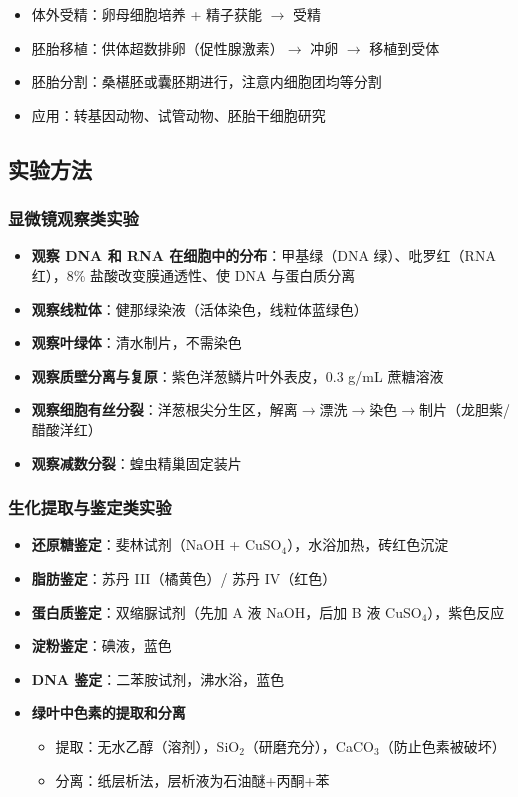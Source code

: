 \begin{itemize}
  \item 体外受精：卵母细胞培养 + 精子获能 $\to$ 受精
  \item 胚胎移植：供体超数排卵（促性腺激素）$\to$ 冲卵 $\to$ 移植到受体
  \item 胚胎分割：桑椹胚或囊胚期进行，注意内细胞团均等分割
  \item 应用：转基因动物、试管动物、胚胎干细胞研究
\end{itemize}

\subsection{实验方法}

\subsubsection{显微镜观察类实验}

\begin{itemize}
  \item \textbf{观察 DNA 和 RNA 在细胞中的分布}：甲基绿（DNA 绿）、吡罗红（RNA 红），8\% 盐酸改变膜通透性、使 DNA 与蛋白质分离
  \item \textbf{观察线粒体}：健那绿染液（活体染色，线粒体蓝绿色）
  \item \textbf{观察叶绿体}：清水制片，不需染色
  \item \textbf{观察质壁分离与复原}：紫色洋葱鳞片叶外表皮，0.3 g/mL 蔗糖溶液
  \item \textbf{观察细胞有丝分裂}：洋葱根尖分生区，解离$\to$漂洗$\to$染色$\to$制片（龙胆紫/醋酸洋红）
  \item \textbf{观察减数分裂}：蝗虫精巢固定装片
\end{itemize}

\subsubsection{生化提取与鉴定类实验}

\begin{itemize}
  \item \textbf{还原糖鉴定}：斐林试剂（NaOH + CuSO$_4$），水浴加热，砖红色沉淀
  \item \textbf{脂肪鉴定}：苏丹 III（橘黄色）/ 苏丹 IV（红色）
  \item \textbf{蛋白质鉴定}：双缩脲试剂（先加 A 液 NaOH，后加 B 液 CuSO$_4$），紫色反应
  \item \textbf{淀粉鉴定}：碘液，蓝色
  \item \textbf{DNA 鉴定}：二苯胺试剂，沸水浴，蓝色
  \item \textbf{绿叶中色素的提取和分离}
  \begin{itemize}
    \item 提取：无水乙醇（溶剂），SiO$_2$（研磨充分），CaCO$_3$（防止色素被破坏）
    \item 分离：纸层析法，层析液为石油醚+丙酮+苯
  \end{itemize}
\end{itemize}

